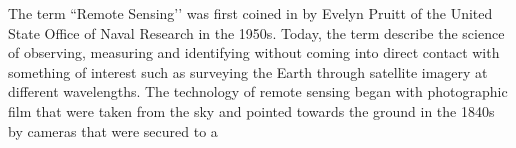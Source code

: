 
The term ``Remote Sensing’’ was first coined in by Evelyn Pruitt of the United State Office of Naval Research in the 1950s. Today, the term describe the science of observing, measuring and identifying without coming into direct contact with something of interest such as surveying the Earth through satellite imagery at different wavelengths. The technology of remote sensing began with photographic film that were taken from the sky and pointed towards the ground in the 1840s by cameras that were secured to a 
